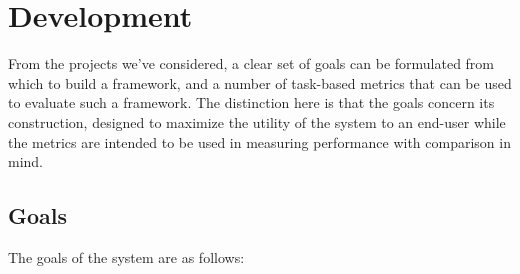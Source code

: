 \documentclass[
12pt, %
oneside, %
english, %
doublespacing, %
headsepline, %
]{MastersDoctoralThesis} %
\begin{document}
\chapter{Development}
\label{Development}

From the projects we've considered, a clear set of goals can be formulated from which to build a framework, and a number of task-based metrics that can be used to evaluate such a framework. The distinction here is that the goals concern its construction, designed to maximize the utility of the system to an end-user while the metrics are intended to be used in measuring performance with comparison in mind.

\section{Goals}

The goals of the system are as follows:
\end{document}
